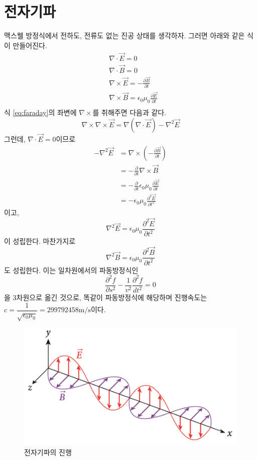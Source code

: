 \section{전자기파}
맥스웰 방정식에서 전하도, 전류도 없는 진공 상태를 생각하자. 그러면 아래와 같은 식이 만들어진다.
\begin{align}
&\nabla \cdot \vec{E}=0\\
&\nabla \cdot \vec{B}=0\\
&\nabla \times \vec{E}=-\frac{\partial \vec{B}}{\partial t}\label{eq:faraday}\\
&\nabla \times \vec{B}=\epsilon_0\mu_0\frac{\partial \vec{E}}{\partial t}\\
\end{align}
식 \ref{eq:faraday}의 좌변에 $\nabla \times$를 취해주면 다음과 같다. 
\begin{equation}
\nabla \times \nabla \times \vec{E}=\nabla (\nabla \cdot \vec{E})-\nabla^2 \vec{E}
\end{equation}
그런데, $\nabla \cdot \vec{E}=0$이므로 
\begin{align}
-\nabla ^2 \vec{E}&=\nabla \times \left( -\frac{\partial \vec{B}}{\partial t}\right)\\
&= -\frac{\partial}{\partial t}\nabla \times \vec{B}\\
&= -\frac{\partial}{\partial t}\epsilon_0\mu_0\frac{\partial \vec{E}}{\partial t}\\
&= -\epsilon_0\mu_0 \frac{\partial ^2 \vec{E}}{\partial t^2}
\end{align}
이고,
\begin{equation}
\nabla ^2 \vec{E}=\epsilon_0\mu_0 \frac{\partial^2\vec{E}}{\partial t^2}
\end{equation}
이 성립한다. 마찬가지로 
\begin{equation}
\nabla ^2 \vec{B}=\epsilon_0\mu_0 \frac{\partial ^2 \vec{B}}{\partial t^2}
\end{equation}
도 성립한다. 이는 일차원에서의 파동방정식인 
\begin{equation}
\frac{\partial ^2 f}{\partial s^2}-\frac{1}{v^2}\frac{\partial ^2 f}{dt^2}=0
\end{equation}
을 3차원으로 옮긴 것으로, 똑같이 파동방정식에 해당하며 진행속도는 $c=\dfrac{1}{\sqrt{\epsilon_0\mu_0}}=299792458\mathrm{m/s}$이다.
\begin{figure}[h]
\centering\includegraphics[scale=0.6]{Pictures/em.PNG}
\caption{전자기파의 진행}
\end{figure}

